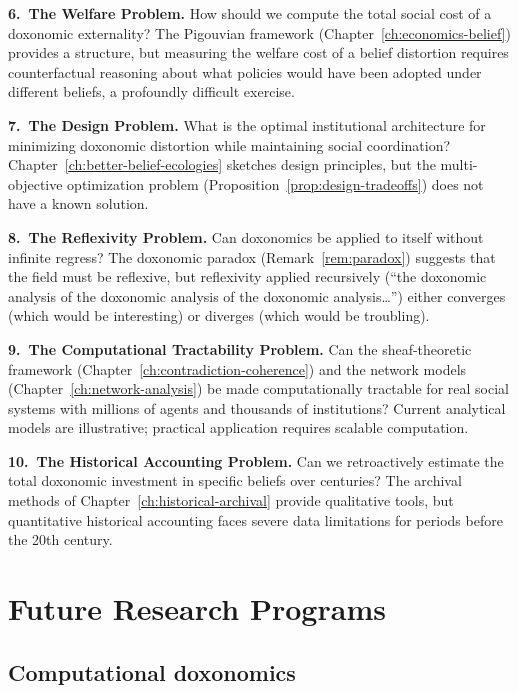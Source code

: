 \begin{conjecture}
\medskip\noindent\textbf{6.\ The Welfare Problem.}
How should we compute the total social cost of a doxonomic externality?
The Pigouvian framework (Chapter~\ref{ch:economics-belief}) provides a structure, but measuring the welfare cost of a belief distortion requires counterfactual reasoning about what policies would have been adopted under different beliefs, a profoundly difficult exercise.

\medskip\noindent\textbf{7.\ The Design Problem.}
What is the optimal institutional architecture for minimizing doxonomic distortion while maintaining social coordination?
Chapter~\ref{ch:better-belief-ecologies} sketches design principles, but the multi-objective optimization problem (Proposition~\ref{prop:design-tradeoffs}) does not have a known solution.

\medskip\noindent\textbf{8.\ The Reflexivity Problem.}
Can doxonomics be applied to itself without infinite regress?
The doxonomic paradox (Remark~\ref{rem:paradox}) suggests that the field must be reflexive, but reflexivity applied recursively (``the doxonomic analysis of the doxonomic analysis of the doxonomic analysis\ldots'') either converges (which would be interesting) or diverges (which would be troubling).

\medskip\noindent\textbf{9.\ The Computational Tractability Problem.}
Can the sheaf-theoretic framework (Chapter~\ref{ch:contradiction-coherence}) and the network models (Chapter~\ref{ch:network-analysis}) be made computationally tractable for real social systems with millions of agents and thousands of institutions?
Current analytical models are illustrative; practical application requires scalable computation.

\medskip\noindent\textbf{10.\ The Historical Accounting Problem.}
Can we retroactively estimate the total doxonomic investment in specific beliefs over centuries?
The archival methods of Chapter~\ref{ch:historical-archival} provide qualitative tools, but quantitative historical accounting faces severe data limitations for periods before the 20th century.
\end{conjecture}

\section{Future Research Programs}
\label{sec:ch35-future}

\subsection{Computational doxonomics}

